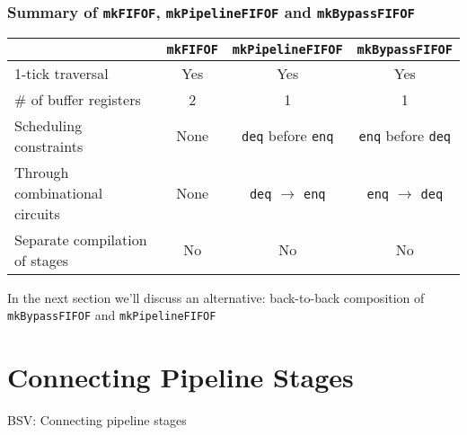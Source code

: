 \begin{frame}

\frametitle{Summary of {\tt mkFIFOF}, {\tt mkPipelineFIFOF} and {\tt mkBypassFIFOF}}

\footnotesize

\begin{center}
    \begin{tabular}{|l|c|c|c|}
      \hline
          &
          {\tt mkFIFOF} &
          {\tt mkPipelineFIFOF} &
          {\tt mkBypassFIFOF} \\
      \hline
      \hline
        1-tick traversal       &   Yes   &  Yes  &  Yes  \\
      \hline
        \# of buffer registers &    2    &   1   &   1   \\
      \hline
        Scheduling constraints &
        None &
        {\tt deq} before {\tt enq} &
        {\tt enq} before {\tt deq} \\
      \hline
        Through combinational circuits &
        None &
        {\tt deq} $\rightarrow$ {\tt enq} &
        {\tt enq} $\rightarrow$ {\tt deq} \\
      \hline
        Separate compilation of stages &
        No &
        No &
        No \\
      \hline
    \end{tabular}
\end{center}

\vx

In the next section we'll discuss an alternative: back-to-back
composition of {\tt mkBypassFIFOF} and {\tt mkPipelineFIFOF}

\end{frame}


\section{Connecting Pipeline Stages}

\begin{frame}

\begin{center}
  {\LARGE BSV: Connecting pipeline stages}
\end{center}

\end{frame}



